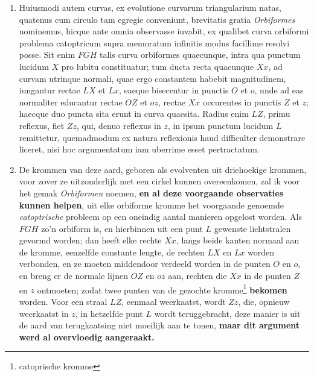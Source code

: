 \documentclass[10pt,a4paper]{article}
\newcommand{\switchenum}{\setcounter{enumi}{\arabic{enumi}-1}\switchcolumn}
\begin{document}
\begin{paracol}{2}
\begin{enumerate}[topsep=1px]
		\item Huiusmodi autem curvas, ex evolutione curvarum triangularium natas, quatenus cum circulo tam egregie conveniunt, brevitatis gratia \textit{Orbiformes} nominemus, hicque ante omnia observasse iuvabit, ex qualibet curva orbiformi problema catoptricum supra memoratum infinitis modus facillime resolvi posse. Sit enim $FGH$ talis curva orbiformes quaecunque, intra qua punctum lucidum $X$ pro lubitu constituatur; tum ducta recta quacunque $Xx$, ad curvam utrinque normali, quae ergo constantem habebit magnitudinem, iungantur rectae $LX$ et $Lx$, eaeque bisecentur in punctis $O$ et $o$, unde ad eas normaliter educantur rectae $OZ$ et $oz$, rectae $Xx$ occurentes in punctis $Z$ et $z$; haecque duo puncta sita erunt in curva quaesita. Radius enim $LZ$, primu reflexus, fiet $Zz$, qui, denuo reflexus in $z$, in ipsum punctum lucidum $L$ remittetur, quemadmodum ex natura reflexionis haud difficulter demonstrare liceret, nisi hoc argumentatum iam uberrime esset pertractatum.
		
		\switchenum
		\item De krommen van deze aard, geboren als evolventen uit driehoekige krommen, voor zover ze uitzonderlijk met een cirkel kunnen overeenkomen, zal ik voor het gemak \textit{Orbiformen} noemen, \textbf{en al deze voorgaande observaties  kunnen helpen}, uit elke orbiforme kromme het voorgaande genoemde \textit{catoptrische} probleem op een oneindig aantal manieren opgelost worden. Als $FGH$ zo'n orbiform is, en hierbinnen uit een punt {\color{red}$L$} gewenste lichtstralen gevormd worden; dan heeft elke rechte $Xx$, langs beide kanten normaal aan de kromme, eenzelfde constante lengte, de rechten $LX$ en $Lx$ worden verbonden, en ze moeten middendoor verdeeld worden in de punten $O$ en $o$, en breng er de normale lijnen $OZ$ en $oz$ aan, rechten die $Xx$ in de punten $Z$ en $z$ ontmoeten; zodat twee punten van de gezochte kromme\footnote{catoprische kromme} \textbf{bekomen} worden. Voor een straal $LZ$, eenmaal weerkaatst, wordt $Zz$, die,  opnieuw weerkaatst in $z$, in hetzelfde punt $L$ wordt teruggebracht, deze manier is uit de aard van terugkaatsing niet moeilijk aan te tonen, \textbf{maar dit argument werd al overvloedig aangeraakt.}
		\switchcolumn*
		

\end{enumerate}
\end{paracol}
\end{document}
